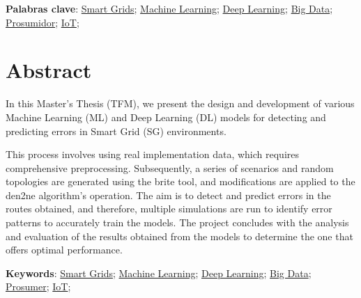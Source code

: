 \vspace{1cm}

\textbf{Palabras clave}: 
\href{https://scholar.google.com/scholar?q=smartgrids}{Smart Grids}; 
\href{https://scholar.google.com/scholar?hl=es&as_sdt=0,5&q=machine+learning}{Machine Learning};
\href{https://scholar.google.com/scholar?hl=es&as_sdt=0%2C5&q=deep+learning&btnG=}{Deep Learning}; 
\href{https://scholar.google.com/scholar?hl=es&as_sdt=0%2C5&q=big+data&btnG=}{Big Data};
\href{https://scholar.google.com/scholar?hl=es&as_sdt=0%2C5&q=prosumidor&btnG=}{Prosumidor}; 
\href{https://scholar.google.com/scholar?hl=es&as_sdt=0%2C5&q=iot&btnG=}{IoT}; 

\cleardoublepage %



\chapter{Abstract}
\thispagestyle{empty}

In this Master's Thesis (TFM), we present the design and development of various Machine Learning (ML) and Deep Learning (DL) models for detecting and predicting errors in Smart Grid (SG) environments. 

\vspace{3mm}

This process involves using real implementation data, which requires comprehensive preprocessing. Subsequently, a series of scenarios and random topologies are generated using the \acrshort{brite} tool, and modifications are applied to the \acrshort{den2ne} algorithm's operation. The aim is to detect and predict errors in the routes obtained, and therefore, multiple simulations are run to identify error patterns to accurately train the models. The project concludes with the analysis and evaluation of the results obtained from the models to determine the one that offers optimal performance.

\vspace{1cm}

\textbf{Keywords}: 
\href{https://scholar.google.com/scholar?q=smartgrids}{Smart Grids}; 
\href{https://scholar.google.com/scholar?hl=es&as_sdt=0,5&q=machine+learning}{Machine Learning};
\href{https://scholar.google.com/scholar?hl=es&as_sdt=0%2C5&q=deep+learning&btnG=}{Deep Learning}; 
\href{https://scholar.google.com/scholar?hl=es&as_sdt=0%2C5&q=big+data&btnG=}{Big Data};
\href{https://scholar.google.com/scholar?hl=es&as_sdt=0%2C5&q=prosumer&btnG=}{Prosumer}; 
\href{https://scholar.google.com/scholar?hl=es&as_sdt=0%2C5&q=iot&btnG=}{IoT}; 

